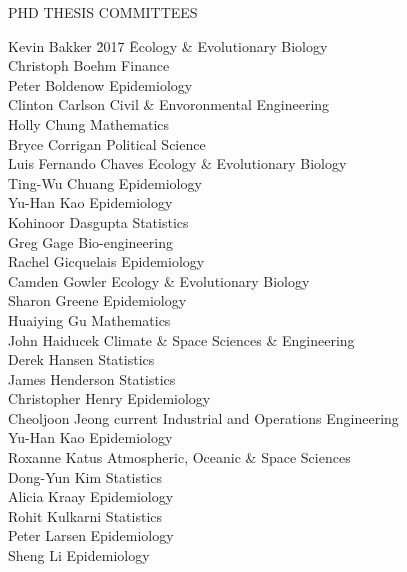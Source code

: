 \begin{mylist}{PHD THESIS COMMITTEES}

\item 
\begin{tabbing}
Kevin Bakker \hspace{2cm} \= 2017 \hspace{1cm} \= Ecology \& Evolutionary Biology\\
Christoph Boehm   \> Finance\\
Peter Boldenow  \> Epidemiology\\
Clinton Carlson  \> Civil \& Envoronmental Engineering\\
Holly Chung  \> Mathematics\\
Bryce Corrigan  \> Political Science\\
Luis Fernando Chaves  \> Ecology \& Evolutionary Biology\\
Ting-Wu Chuang  \> Epidemiology\\
Yu-Han Kao  \> Epidemiology\\
Kohinoor Dasgupta  \> Statistics \\
Greg Gage  \> Bio-engineering\\ 
Rachel Gicquelais  \> Epidemiology\\
Camden Gowler  \> Ecology \& Evolutionary Biology\\
Sharon Greene  \> Epidemiology\\ 
Huaiying Gu  \> Mathematics\\
John Haiducek \> Climate \& Space Sciences \& Engineering\\
Derek Hansen \> Statistics\\
James Henderson  \> Statistics\\
Christopher Henry  \> Epidemiology\\
Cheoljoon Jeong \> current \> Industrial and Operations Engineering\\
Yu-Han Kao  \> Epidemiology\\
Roxanne Katus  \> Atmospheric, Oceanic \& Space Sciences\\
Dong-Yun Kim  \> Statistics\\
Alicia Kraay  \> Epidemiology\\
Rohit Kulkarni  \> Statistics\\
Peter Larsen  \> Epidemiology\\
Sheng Li  \>Epidemiology\\

\end{tabbing}
\end{mylist}
